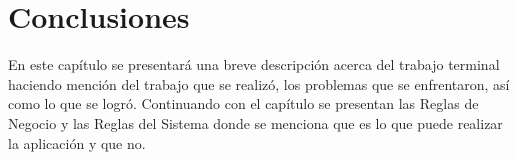 \chapter*{Conclusiones}
{}
	\noindent 
	En este capítulo se presentará una breve descripción acerca del trabajo terminal haciendo mención del trabajo que se realizó, los problemas que se enfrentaron, así como lo que se logró. Continuando con el capítulo se presentan las Reglas de Negocio y las Reglas del Sistema donde se menciona que es lo que puede realizar la aplicación y que no.\\
	